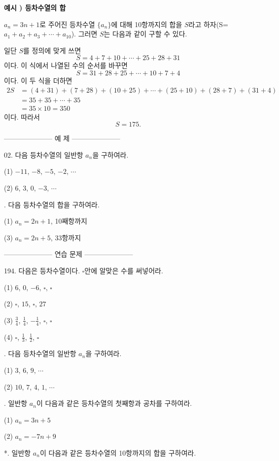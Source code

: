 \documentclass{article}
\newcounter{num}
\newcommand{\exam}[1]
{\bigskip\noindent\refstepcounter{num}\textbf{예시 \arabic{num}) #1}\par}
\begin{document}
\exam{등차수열의 합}
\(a_n=3n+1\)로 주어진 등차수열 \(\{a_n\}\)에 대해 10항까지의 합을 \(S\)라고 하자(S=\(a_1+a_2+a_3+\cdots+a_{10}\)).
그러면 \(S\)는 다음과 같이 구할 수 있다.

일단 \(S\)를 정의에 맞게 쓰면
\[
S=4+7+10+\cdots+25+28+31
\]
이다.
이 식에서 나열된 수의 순서를 바꾸면
\[
S=31+28+25+\cdots+10+7+4
\]
이다.
이 두 식을 더하면
\begin{align*}
2S
&=(4+31)+(7+28)+(10+25)+\cdots+(25+10)+(28+7)+(31+4)\\
&=35+35+\cdots+35\\
&=35\times10=350
\end{align*}
이다.
따라서
\[S=175.\]

\bigskip\bigskip
--------------------- 예 제 ---------------------

02.
다음 등차수열의 일반항 \(a_n\)을 구하여라.

\quad\:
(1) \(-11\), \(-8\), \(-5\), \(-2\), \(\cdots\)

\quad\:
(2) \(6\), \(3\), \(0\), \(-3\), \(\cdots\)

.
다음 등차수열의 합을 구하여라.

\quad\:
(1) \(a_n=2n+1\), 10째항까지

\quad\:
(3) \(a_n=2n+5\), 33항까지

\bigskip\bigskip
--------------------- 연습 문제 ---------------------

194.
다음은 등차수열이다. \(\square\)안에 알맞은 수를 써넣어라.

\quad\:
(1) \(6\), \(0\), \(-6\), \(\square\), \(\square\)

\quad\:
(2) \(\square\), \(15\), \(\square\), \(27\)

\quad\:
(3) \(\frac34\), \(\frac14\), \(-\frac14\), \(\square\), \(\square\)

\quad\:
(4) \(\square\), \(\frac13\), \(\frac12\), \(\square\)

.
다음 등차수열의 일반항 \(a_n\)을 구하여라.

\quad\:
(1) \(3\), \(6\), \(9\), \(\cdots\)

\quad\:
(2) \(10\), \(7\), \(4\), \(1\), \(\cdots\)

.
일반항 \(a_n\)이 다음과 같은 등차수열의 첫째항과 공차를 구하여라.

\quad\:
(1) \(a_n=3n+5\)

\quad\:
(2) \(a_n=-7n+9\)

*.
일반항 \(a_n\)이 다음과 같은 등차수열의 10항까지의 합을 구하여라.
\end{document}
